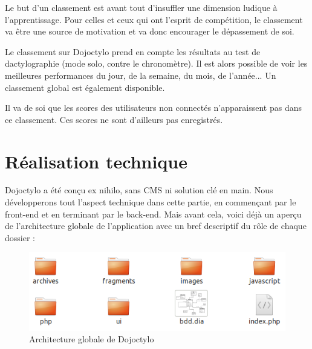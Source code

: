 \documentclass[a4paper,12pt]{article}
\begin{document}
Le but d'un classement est avant tout d'insuffler une dimension ludique à l'apprentissage. Pour celles et ceux qui ont l'esprit de compétition, le classement va être une source de motivation et va donc encourager le dépassement de soi.

Le classement sur Dojoctylo prend en compte les résultats au test de dactylographie (mode solo, contre le chronomètre). Il est alors possible de voir les meilleures performances du jour, de la semaine, du mois, de l'année... Un classement global est également disponible.

Il va de soi que les scores des utilisateurs non connectés n'apparaissent pas dans ce classement. Ces scores ne sont d'ailleurs pas enregistrés.

\newpage


\part{Réalisation technique}

Dojoctylo a été conçu ex nihilo, sans CMS ni solution clé en main. Nous développerons tout l'aspect technique dans cette partie, en commençant par le front-end et en terminant par le back-end. Mais avant cela, voici déjà un aperçu de l'architecture globale de l'application avec un bref descriptif du rôle de chaque dossier :

\begin{figure}[!h]
\begin{center}
\includegraphics[scale=0.5]{architecture-globale.png}
\end{center}
\caption{Architecture globale de Dojoctylo}
\end{figure}
\end{document}
